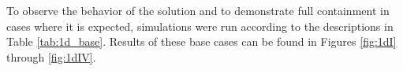 To observe the behavior of the solution and to demonstrate full containment in 
cases where it is expected, simulations were run according to the descriptions 
in Table \ref{tab:1d_base}.  Results of these base cases can be found in 
Figures \ref{fig:1dI} through \ref{fig:1dIV}.  

%

\FloatBarrier
